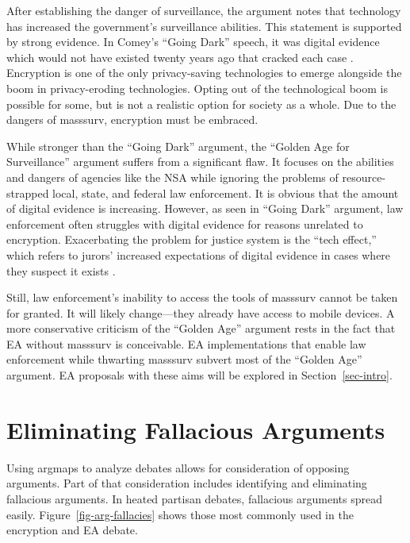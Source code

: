 \documentclass{IEEEtran}
\newcommand{\myfig}[1]{Figure~\ref{#1}}
\newcommand{\mysec}[1]{Section~\ref{#1}}
\begin{document}
After establishing the danger of surveillance, the argument notes that technology has increased the government's
surveillance abilities. This statement is supported by strong evidence. In Comey's ``Going Dark'' speech, it was digital
evidence which would not have existed twenty years ago that cracked each case \cite{comey_2014}. Encryption is one of
the only privacy-saving technologies to emerge alongside the boom in privacy-eroding technologies. Opting out of the
technological boom is possible for some, but is not a realistic option for society as a whole. Due to the dangers of
\ac{masssurv}, \ac{encryption} must be embraced.

While stronger than the ``Going Dark'' argument, the ``Golden Age for Surveillance'' argument suffers from a significant
flaw. It focuses on the abilities and dangers of agencies like the \ac{NSA} while ignoring the problems of
resource-strapped local, state, and federal law enforcement. It is obvious that the amount of digital evidence is
increasing. However, as seen in ``Going Dark'' argument, law enforcement often struggles with digital evidence for
reasons unrelated to encryption. Exacerbating the problem for justice system is the ``tech effect,'' which refers to
jurors' increased expectations of digital evidence in cases where they suspect it exists \cite{shelton_study_2006}.

Still, law enforcement's inability to access the tools of \ac{masssurv} cannot be taken for granted. It will likely
change---they already have access to mobile devices. A more conservative criticism of the ``Golden Age'' argument rests
in the fact that \ac{EA} without \ac{masssurv} is conceivable. \ac{EA} implementations that enable law enforcement while
thwarting \ac{masssurv} subvert most of the ``Golden Age'' argument. \ac{EA} proposals with these aims will be explored
in \mysec{sec-intro}.



\section{Eliminating Fallacious Arguments}

Using \acp{argmap} to analyze debates allows for consideration of opposing arguments. Part of that consideration
includes identifying and eliminating fallacious arguments. In heated partisan debates, fallacious arguments spread
easily. \myfig{fig-arg-fallacies} shows those most commonly used in the encryption and \ac{EA} debate.
\end{document}
